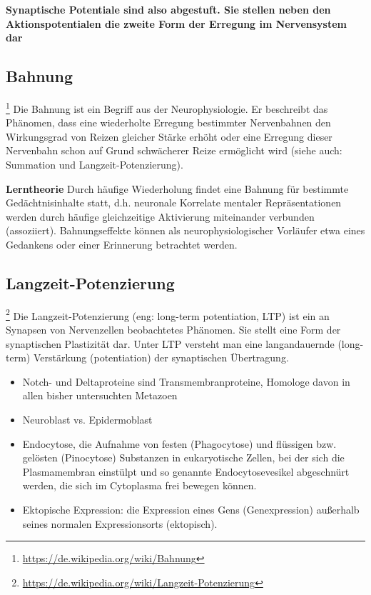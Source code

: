 \textbf{Synaptische Potentiale sind also abgestuft. Sie stellen neben den Aktionspotentialen die zweite Form der Erregung im Nervensystem dar}

\subsection{Bahnung}\footnote{\url{https://de.wikipedia.org/wiki/Bahnung}}
Die Bahnung ist ein Begriff aus der Neurophysiologie. Er beschreibt das Phänomen, dass eine wiederholte Erregung bestimmter Nervenbahnen den Wirkungsgrad von Reizen gleicher Stärke erhöht oder eine Erregung dieser Nervenbahn schon auf Grund schwächerer Reize ermöglicht wird (siehe auch: Summation und Langzeit-Potenzierung).

\textbf{Lerntheorie}
Durch häufige Wiederholung findet eine Bahnung für bestimmte Gedächtnisinhalte statt, d.h. neuronale Korrelate mentaler Repräsentationen werden durch häufige gleichzeitige Aktivierung miteinander verbunden (assoziiert). Bahnungseffekte können als neurophysiologischer Vorläufer etwa eines Gedankens oder einer Erinnerung betrachtet werden.

\subsection{Langzeit-Potenzierung}\footnote{\url{https://de.wikipedia.org/wiki/Langzeit-Potenzierung}}
Die Langzeit-Potenzierung (eng: long-term potentiation, LTP) ist ein an Synapsen von Nervenzellen beobachtetes Phänomen. Sie stellt eine Form der synaptischen Plastizität dar. Unter LTP versteht man eine langandauernde (long-term) Verstärkung (potentiation) der synaptischen Übertragung.

\begin{itemize}
	\item Notch- und Deltaproteine sind Transmembranproteine, Homologe davon in allen bisher untersuchten Metazoen 
	\item Neuroblast vs. Epidermoblast
	\item Endocytose, die Aufnahme von festen (Phagocytose) und flüssigen bzw. gelösten (Pinocytose) Substanzen in eukaryotische Zellen, bei der sich die Plasmamembran einstülpt und so genannte Endocytosevesikel abgeschnürt werden, die sich im Cytoplasma frei bewegen können.
	\item Ektopische Expression: die Expression eines Gens (Genexpression) außerhalb seines normalen Expressionsorts (ektopisch).
\end{itemize}